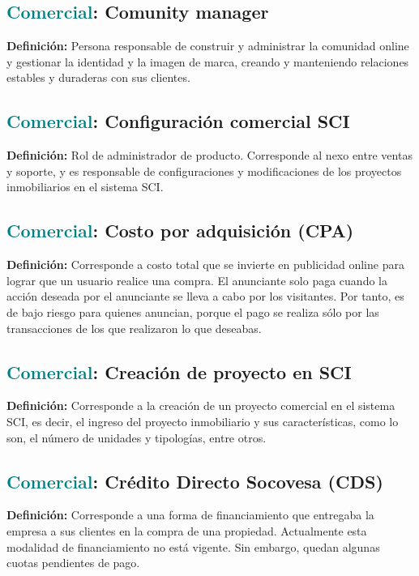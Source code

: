 \documentclass[12pt]{article}
\begin{document}
\subsection{\textcolor{teal}{Comercial}: Comunity manager}
\textbf{Definición:}  Persona responsable de construir y administrar la comunidad online y gestionar la identidad y la imagen de marca, creando y manteniendo relaciones estables y duraderas con sus clientes.
\subsection{\textcolor{teal}{Comercial}: Configuración comercial SCI}
\textbf{Definición:} Rol de administrador de producto. Corresponde al nexo entre ventas y soporte, y es responsable de configuraciones y modificaciones de los proyectos inmobiliarios en el sistema SCI.
\subsection{\textcolor{teal}{Comercial}: Costo por adquisición (CPA)}
\textbf{Definición:} Corresponde a costo total que se invierte en publicidad online para lograr que un usuario realice una compra. El anunciante solo paga cuando la acción deseada por el anunciante se lleva a cabo por los visitantes. Por tanto, es de bajo riesgo para quienes anuncian, porque el pago se realiza sólo por las transacciones de los que realizaron lo que deseabas.
\subsection{\textcolor{teal}{Comercial}: Creación de proyecto en SCI}
\textbf{Definición:} Corresponde a la creación de un proyecto comercial en el sistema SCI, es decir, el ingreso del proyecto inmobiliario y sus características, como lo son, el número de unidades y tipologías, entre otros.
\subsection{\textcolor{teal}{Comercial}: Crédito Directo Socovesa (CDS)}
\textbf{Definición:} Corresponde a una forma de financiamiento que entregaba la empresa a sus clientes en la compra de una propiedad. Actualmente esta modalidad de financiamiento no está vigente. Sin embargo, quedan algunas cuotas pendientes de pago.
\end{document}
